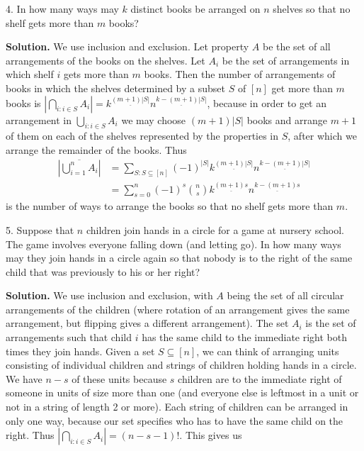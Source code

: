 \documentclass[10pt,]{book}
\theoremstyle{plain}
\theoremstyle{definition}
\theoremstyle{definition}
\numberwithin{equation}{chapter}
\begin{document}
\begin{exerciselist}
\item[4.]\hypertarget{exercise-49}{}In how many ways may \(k\) distinct books be arranged on \(n\) shelves so that no shelf gets more than \(m\) books?%
\par\smallskip
\par\smallskip
\noindent\textbf{Solution.}\hypertarget{solution-406}{}\quad
We use inclusion and exclusion. Let property \(A\) be the set of all arrangements of the books on the shelves. Let \(A_i\) be the set of arrangements in which shelf \(i\) gets more than \(m\) books. Then the number of arrangements of books in which the shelves determined by a subset \(S\) of \([n]\) get more than \(m\) books is \(\left|\bigcap_{i\colon i\in S} A_i\right| = k^{\underline{(m+1)|S|}}n^{\underline{k-(m+1)|S|}}\), because in order to get an arrangement in \(\bigcup_{i\colon i\in S} A_i\) we may choose \((m+1)|S|\) books and arrange \(m+1\) of them on each of the shelves represented by the properties in \(S\), after which we arrange the remainder of the books. Thus%
\begin{align*}
\left|\overline{\bigcup_{i=1}^n A_i}\right| &=\sum_{S:S\subseteq [n]} (-1)^{|S|}
k^{\underline{(m+1)|S|}}n^{\underline{k-(m+1)|S|}}
\\
&=\sum_{s=0}^n
(-1)^s\binom{n}{s}k^{\underline{(m+1)s}}n^{\underline{k-(m+1)s}}
\end{align*}
is the number of ways to arrange the books so that no shelf gets more than \(m\).%
\item[5.]\hypertarget{exercise-50}{}Suppose that \(n\) children join hands in a circle for a game at nursery school. The game involves everyone falling down (and letting go). In how many ways may they join hands in a circle again so that nobody is to the right of the same child that was previously to his or her right?%
\par\smallskip
\par\smallskip
\noindent\textbf{Solution.}\hypertarget{solution-407}{}\quad
We use inclusion and exclusion, with \(A\) being the set of all circular arrangements of the children (where rotation of an arrangement gives the same arrangement, but flipping gives a different arrangement). The set \(A_i\) is the set of arrangements such that child \(i\) has the same child to the immediate right both times they join hands. Given a set \(S\subseteq [n]\), we can think of arranging units consisting of individual children and strings of children holding hands in a circle. We have \(n-s\) of these units because \(s\) children are to the immediate right of someone in units of size more than one (and everyone else is leftmost in a unit or not in a string of length 2 or more). Each string of children can be arranged in only one way, because our set specifies who has to have the same child on the right. Thus \(\left|\bigcap_{i\colon i\in S} A_i\right| = (n-s-1)!\). This gives us%

\end{exerciselist}
\end{document}
